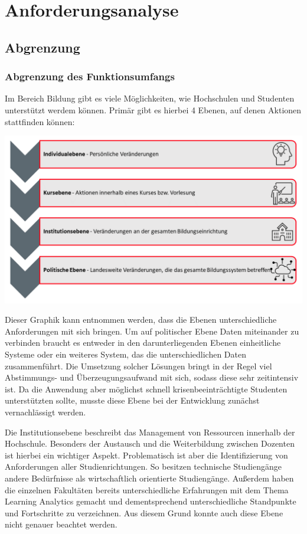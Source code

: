 \chapter{Anforderungsanalyse} %
\section{Abgrenzung}
\subsection{Abgrenzung des Funktionsumfangs}\label{sub:abgrenzung}
Im Bereich Bildung gibt es viele Möglichkeiten, wie Hochschulen und Studenten unterstützt werdem können.
Primär gibt es hierbei 4 Ebenen, auf denen Aktionen stattfinden können:
\begin{center}
	\includegraphics[width=\linewidth, keepaspectratio]{img/4LA.png}
\end{center}
Dieser Graphik kann entnommen werden, dass die Ebenen unterschiedliche Anforderungen mit sich bringen. Um auf politischer Ebene Daten miteinander zu verbinden braucht es entweder in den darunterliegenden Ebenen einheitliche Systeme oder ein weiteres System, das die unterschiedlichen Daten zusammenführt. Die Umsetzung solcher Lösungen bringt in der Regel viel Abstimmungs- und Überzeugungsaufwand mit sich, sodass diese sehr zeitintensiv ist. Da die Anwendung aber möglichst schnell krisenbeeinträchtigte Studenten unterstützten sollte, musste diese Ebene bei der Entwicklung zunächst vernachlässigt werden.

Die Institutionsebene beschreibt das Management von Ressourcen innerhalb der Hochschule. Besonders der Austausch und die Weiterbildung zwischen Dozenten ist hierbei ein wichtiger Aspekt. Problematisch ist aber die Identifizierung von Anforderungen aller Studienrichtungen. So besitzen technische Studiengänge andere Bedürfnisse als wirtschaftlich orientierte Studiengänge. Außerdem haben die einzelnen Fakultäten bereits unterschiedliche Erfahrungen mit dem Thema Learning Analytics gemacht und dementsprechend unterschiedliche Standpunkte und Fortschritte zu verzeichnen. Aus diesem Grund konnte auch diese Ebene nicht genauer beachtet werden.

